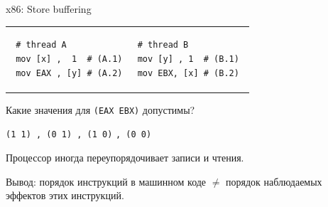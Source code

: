  \begin{frame}{x86: Store buffering}
 
 \begin{tabular}{p{} p{}}
 \begin{verbatim}
 # thread A
 mov [x] ,  1  # (A.1)
 mov EAX , [y] # (A.2)
 \end{verbatim}
 
 & 
 
 \begin{verbatim}
 # thread B          
 mov [y] , 1  # (B.1) 
 mov EBX, [x] # (B.2) 
 \end{verbatim}
 \end{tabular}
 
 Какие значения для \texttt{(EAX EBX)} допустимы?
 
   \texttt{(1 1)\ , (0 1)\ , (1 0)}
 \pause
 {\color{red} \texttt{, (0 0)}}
 
 \pause
 Процессор иногда переупорядочивает записи и чтения.
 
 \pause
 Вывод: порядок инструкций в машинном коде $\neq$ порядок наблюдаемых эффектов этих инструкций.

 \pause


\end{frame}
 
